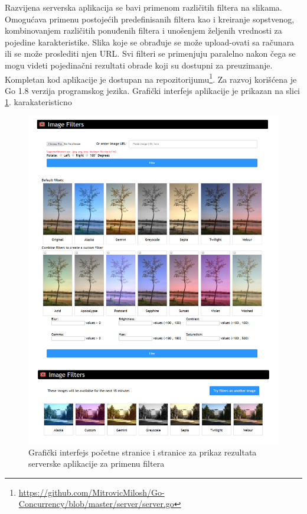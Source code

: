 \documentclass[12pt,oneside]{memoir}
\begin{document}
Razvijena serverska aplikacija se bavi primenom različitih filtera na slikama. Omogućava primenu postojećih predefinisanih filtera kao i kreiranje sopstvenog, kombinovanjem različitih ponuđenih filtera i unošenjem željenih vrednosti za pojedine karakteristike. Slika koje se obrađuje se može upload-ovati sa računara ili se može proslediti njen URL. Svi filteri se primenjuju paralelno nakon čega se mogu videti pojedinačni rezultati obrade koji su dostupni za preuzimanje. Kompletan kod aplikacije je dostupan na repozitorijumu\footnote{\url{https://github.com/MitrovicMilosh/Go-Concurrency/blob/master/server/server.go}}. Za razvoj korišćena je Go 1.8 verzija programskog jezika. Grafički interfejs aplikacije je prikazan na slici \ref{fig:interface}.
karakateristicno
\begin{figure}
\begin{center}
\includegraphics[scale=1.4]{interface.png}
\end{center}
\caption{Grafički interfejs početne stranice i stranice za prikaz rezultata serverske aplikacije za primenu filtera}
\label{fig:interface}
\end{figure}
\end{document}
